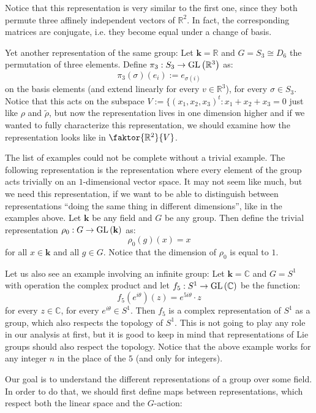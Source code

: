 \begin{examples}
\begin{i_enum}
Notice that this representation is very similar to the first one, since they both permute three affinely independent vectors of $\mathbb{R}^2$. In fact, the corresponding matrices are conjugate, i.e. they become equal under a change of basis.
\item Yet another representation of the same group: Let $\mathbf{k}=\mathbb{R}$ and $G=S_3\cong D_6$ the permutation of three elements. Define $\pi_3:S_3\to\GL{\mathbb{R}^3}$ as:
$$\pi_3(\sigma)(e_i):=e_{\sigma(i)}$$
on the basis elements (and extend linearly for every $v\in\mathbb{R}^3$), for every $\sigma\in S_3$. Notice that this acts on the subspace $V:=\{(x_1,x_2,x_3)^t:x_1+x_2+x_3=0$ just like $\rho$ and $\tilde{\rho}$, but now the representation lives in one dimension higher and if we wanted to fully characterize this representation, we should examine how the representation looks like in $\faktor{\mathbb{R}^2}{V}$.
\item The list of examples could not be complete without a trivial example. The following representation is the representation where every element of the group acts trivially on an $1$-dimensional vector space. It may not seem like much, but we need this representation, if we want to be able to distinguish between representations ``doing the same thing in different dimensions'', like in the examples above. Let $\mathbf{k}$ be any field and $G$ be any group. Then define the trivial representation $\rho_0:G\to\GL{\mathbf{k}}$ as:
$$\rho_0(g)(x)=x$$
for all $x\in\mathbf{k}$ and all $g\in G$. Notice that the dimension of $\rho_0$ is equal to $1$.
\item Let us also see an example involving an infinite group: Let $\mathbf{k}=\mathbb{C}$ and $G=S^1$ with operation the complex product and let $f_5:S^1\to\GL{\mathbb{C}}$ be the function:
$$f_5(e^{i\theta})(z)=e^{5i\theta}\cdot z$$
for every $z\in\mathbb{C}$, for every $e^{i\theta}\in S^1$. Then $f_5$ is a complex representation of $S^1$ as a group, which also respects the topology of $S^1$. This is not going to play any role in our analysis at first, but it is good to keep in mind that representations of Lie groups should also respect the topology. Notice that the above example works for any integer $n$ in the place of the $5$ (and only for integers).
\end{i_enum}
\end{examples}

Our goal is to understand the different representations of a group over some field. In order to do that, we should first define maps between representations, which respect both the linear space and the $G$-action:

